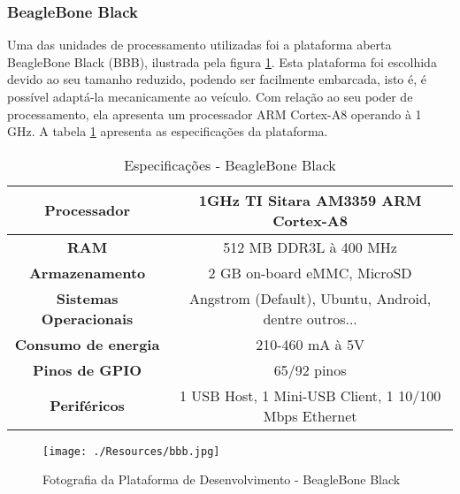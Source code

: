 \subsubsection{BeagleBone Black}

Uma das unidades de processamento utilizadas foi a plataforma aberta BeagleBone Black (BBB), ilustrada pela figura \ref{bbb}. Esta plataforma foi escolhida devido ao seu tamanho reduzido, podendo ser facilmente embarcada, isto é, é possível adaptá-la mecanicamente ao veículo. Com relação ao seu poder de processamento, ela apresenta um processador ARM Cortex-A8 operando à 1 GHz. A tabela \ref{bbb_tab} apresenta as especificações da plataforma.

\begin{table}[]
\centering
\caption{Especificações - BeagleBone Black}
\label{bbb_tab}
\begin{tabular}{|c|c|}
\hline
\textbf{Processador}           & 1GHz TI Sitara AM3359 ARM Cortex-A8			\\	\hline
\textbf{RAM}                   & 512 MB DDR3L à 400 MHz					\\	\hline
\textbf{Armazenamento}         & 2 GB on-board eMMC, MicroSD				\\	\hline
\textbf{Sistemas Operacionais} & Angstrom (Default), Ubuntu, Android, dentre outros...	\\	\hline
\textbf{Consumo de energia}    & 210-460 mA à 5V					\\	\hline
\textbf{Pinos de GPIO}         & 65/92 pinos						\\	\hline
\textbf{Periféricos}           & 1 USB Host, 1 Mini-USB Client, 1 10/100 Mbps Ethernet  \\	\hline                              
\end{tabular}
\end{table}

\begin{figure}[H]
	\centering
	\texttt{[image: ./Resources/bbb.jpg]}
	\caption{Fotografia da Plataforma de Desenvolvimento - BeagleBone Black}
	\label{bbb}
\end{figure}


